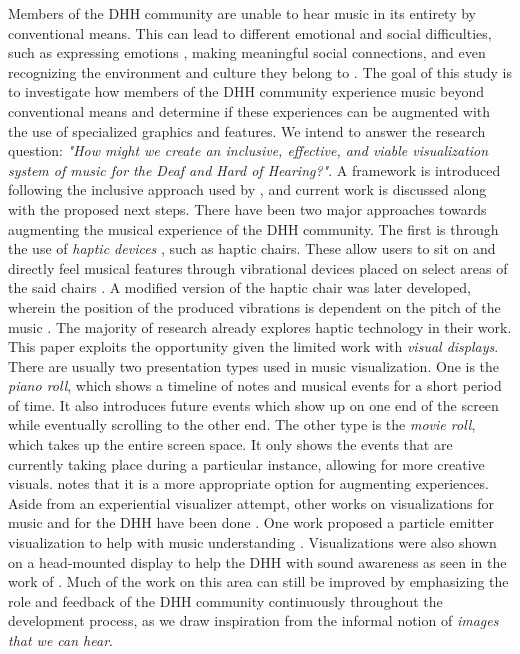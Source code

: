 \documentclass{sigchi-ext}
\begin{document}
Members of the DHH community are unable to hear music in its entirety by conventional means. This can lead to different emotional and social difficulties, such as expressing emotions \cite{Nelson:2016, Walker:2013}, making meaningful social connections, and even recognizing the environment and culture they belong to \cite{Gfeller:2012, Ribiero:2017}. The goal of this study is to investigate how members of the DHH community experience music beyond conventional means and determine if these experiences can be augmented with the use of specialized graphics and features.  We intend to answer the research question: \textit{"How might we create an inclusive, effective, and viable visualization system of music for the Deaf and Hard of Hearing?"}. A framework is introduced following the inclusive approach used by \cite{deja2019myosl}, and current work is discussed along with the proposed next steps. There have been two major approaches towards augmenting the musical experience of the DHH community. The first is through the use of \textit{haptic devices} \cite{Balandra:2016}, such as haptic chairs. These allow users to sit on and directly feel musical features through vibrational devices placed on select areas of the said chairs \cite{Nanayakkara:2009:EME}. A modified version of the haptic chair was later developed, wherein the position of the produced vibrations is dependent on the pitch of the music \cite{Jack:2015}. The majority of research already explores haptic technology in their work. This paper exploits the opportunity given the limited work with \textit{visual displays}.
There are usually two presentation types used in music visualization. One is the \textit{piano roll}, which shows a timeline of notes and musical events for a short period of time. It also introduces future events which show up on one end of the screen while eventually scrolling to the other end. The other type is the \textit{movie roll}, which takes up the entire screen space. It only shows the events that are currently taking place during a particular instance, allowing for more creative visuals. \cite{Nanayakkara:2007} notes that it is a more appropriate option for augmenting experiences. Aside from an experiential visualizer attempt, other works on visualizations for music and for the DHH have been done \cite{Fonteles:2013,Jain:2015,Petry:2016}. One work proposed a particle emitter visualization to help with music understanding \cite{Fonteles:2013}. Visualizations were also shown on a head-mounted display to help the DHH with sound awareness as seen in the work of \cite{Jain:2015}. Much of the work on this area can still be improved by emphasizing the role and feedback of the DHH community continuously throughout the development process, as we draw inspiration from the informal notion of \textit{images that we can hear}.
\end{document}
